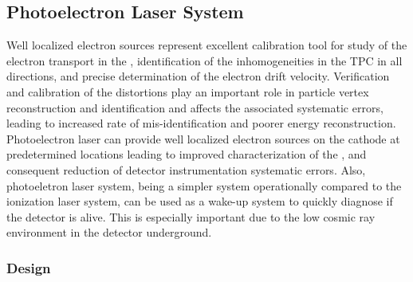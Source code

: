 \subsection{Photoelectron Laser System}
\label{sec:sp-calib-sys-las-pe}
Well localized electron sources represent excellent calibration tool for study of the electron transport in the , identification of the inhomogeneities in the TPC \efield in all directions, and precise determination of the electron drift velocity. Verification and calibration of the \efield distortions play an important role in particle vertex reconstruction and identification and affects the associated systematic errors, leading to increased rate of mis-identification and poorer energy reconstruction. Photoelectron laser can provide well localized electron sources on the cathode at predetermined locations leading to improved characterization of the \efield, and consequent reduction of detector instrumentation systematic errors. Also, photoeletron laser system, being a simpler system operationally compared to the ionization laser system, can be used as a wake-up system to quickly diagnose if the detector is alive. This is especially important due to the low cosmic ray environment in the detector underground. 

\subsubsection{Design}
\label{sec:sp-calib-sys-las-pe-des}

